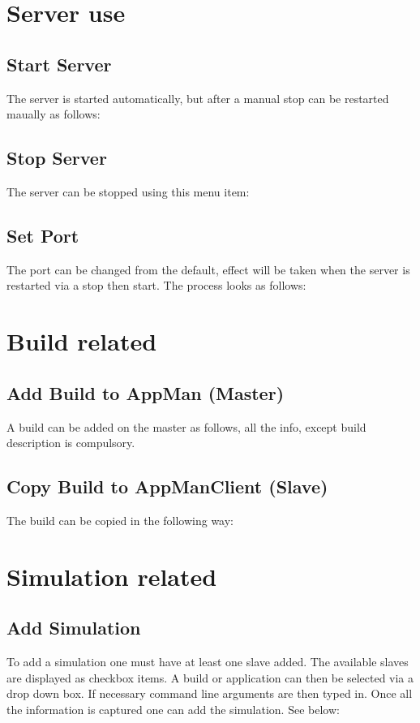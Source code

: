 \documentclass[a4paper,12pt,final]{article}
\begin{document}
\section{Server use}

\subsection{Start Server}
The server is started automatically, but after a manual stop can be restarted maually as follows:

\subsection{Stop Server}
The server can be stopped using this menu item:

\subsection{Set Port}
The port can be changed from the default, effect will be taken when the server is restarted via a stop then start. The process looks as follows:

\section{Build related}

\subsection{Add Build to AppMan (Master)}
A build can be added on the master as follows, all the info, except build description is compulsory.

\subsection{Copy Build to AppManClient (Slave)}
The build can be copied in the following way:

\section{Simulation related}

\subsection{Add Simulation}
To add a simulation one must have at least one slave added. The available slaves are displayed as checkbox items. A build or application can then be selected via a drop down box. If necessary command line arguments are then typed in. Once all the information is captured one can add the simulation. See below:
\end{document}
